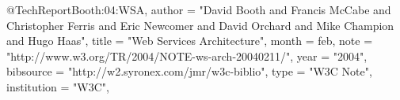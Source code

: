 @TechReport{Booth:04:WSA,
  author      = "David Booth and Francis McCabe and Christopher Ferris and Eric Newcomer and David Orchard and Mike Champion and Hugo Haas",
  title       = "Web Services Architecture",
  month       = feb,
  note        = "http://www.w3.org/TR/2004/NOTE-ws-arch-20040211/",
  year        = "2004",
  bibsource   = "http://w2.syronex.com/jmr/w3c-biblio",
  type        = "{W3C} Note",
  institution = "W3C",
}